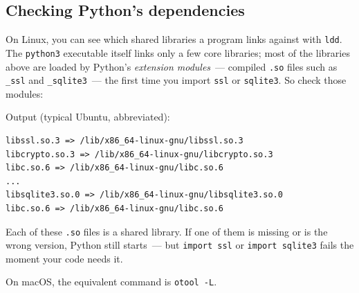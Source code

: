 \subsection*{Checking Python's dependencies}\label{06-local-dependencies:checking-pythons-dependencies}

On Linux, you can see which shared libraries a program links against with \texttt{ldd}. The \texttt{python3} executable itself links only a few core libraries; most of the libraries above are loaded by Python's \emph{extension modules}~--- compiled \texttt{.so} files such as \texttt{\_ssl} and \texttt{\_sqlite3}~--- the first time you import \texttt{ssl} or \texttt{sqlite3}. So check those modules:

\begin{codebox}[short]

\begin{Shaded}
\begin{Highlighting}[]
 \VariableTok{$(}  \VariableTok{)}
 \VariableTok{$(}  \VariableTok{)}
\end{Highlighting}
\end{Shaded}

\end{codebox}

\noindent{}Output (typical Ubuntu, abbreviated):

\begin{outputbox}[short]
\begin{Verbatim}[fontsize=\codesize, breaklines, breakanywhere, breaksymbolleft={\tiny\textcolor{muted}{$\hookrightarrow$}}]
libssl.so.3 => /lib/x86_64-linux-gnu/libssl.so.3
libcrypto.so.3 => /lib/x86_64-linux-gnu/libcrypto.so.3
libc.so.6 => /lib/x86_64-linux-gnu/libc.so.6
...
libsqlite3.so.0 => /lib/x86_64-linux-gnu/libsqlite3.so.0
libc.so.6 => /lib/x86_64-linux-gnu/libc.so.6
\end{Verbatim}
\end{outputbox}

\noindent{}Each of these \texttt{.so} files is a shared library. If one of them is missing or is the wrong version, Python still starts~--- but \texttt{import\ ssl} or \texttt{import\ sqlite3} fails the moment your code needs it.

On macOS, the equivalent command is \texttt{otool\ -L}.

